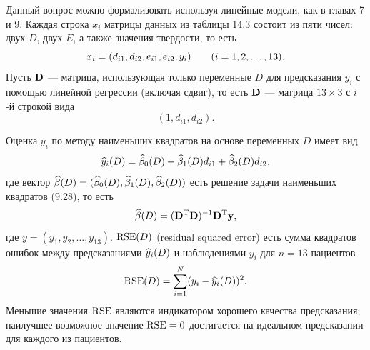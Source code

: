 Данный вопрос можно формализовать используя линейные модели, как в главах 7 и 9. Каждая строка $x_i$ матрицы данных из таблицы 14.3 состоит из пяти чисел: двух $D$, двух $E$, а также значения твердости, то есть
\begin{equation}
  x_i = (d_{i1}, d_{i2}, e_{i1}, e_{i2}, y_i) \qquad (i = 1,2,\ldots,13).
\end{equation}
Пусть $\mathbf D$ --- матрица, использующая только переменные $D$ для предсказания $y_i$ с помощью линейной регрессии (включая сдвиг), то есть $\mathbf D$ --- матрица $13 \times 3$ с $i$-й строкой вида
\begin{equation}
  (1, d_{i1}, d_{i2}).
\end{equation}

Оценка $y_i$ по методу наименьших квадратов на основе переменных $D$ имеет вид
\begin{equation}
  \widehat{y}_i(D) = \widehat{\beta}_0(D) + \widehat{\beta}_1(D) d_{i1} + \widehat{\beta}_2(D) d_{i2},
\end{equation}
где вектор $\widehat{\beta} (D) = (\widehat{\beta}_0(D),\widehat{\beta}_1(D) , \widehat{\beta}_2(D))$ есть решение задачи наименьших квадратов
(9.28), то есть
\begin{equation}
  \widehat{\beta} (D) = (\mathbf D^\mathrm{T} \mathbf D)^{-1} \mathbf D^\mathrm{T}\mathbf y,
\end{equation}
где $y = (y_1,y_2,\ldots,y_{13})$. $\text{RSE}(D)$ (residual squared error) есть сумма квадратов ошибок между предсказаниями $\widehat{y}_i (D)$ и наблюдениями $y_i$ для $n = 13$ пациентов
\begin{equation}
  \text{RSE}(D) = \sum_{i=1}^{N} (y_i - \widehat{y}_i (D))^2.
\end{equation}
Меньшие значения $\text{RSE}$ являются индикатором хорошего качества предсказания; наилучшее возможное значение $\text{RSE} = 0$ достигается на идеальном предсказании для каждого из пациентов.

